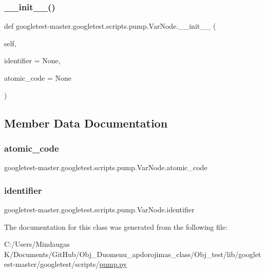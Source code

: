 \subsubsection{\texorpdfstring{\_\_init\_\_()}{\_\_init\_\_()}}
{\footnotesize\ttfamily def googletest-\/master.\+googletest.\+scripts.\+pump.\+Var\+Node.\+\_\+\+\_\+init\+\_\+\+\_\+ (\begin{DoxyParamCaption}\item[{}]{self,  }\item[{}]{identifier = {\ttfamily None},  }\item[{}]{atomic\+\_\+code = {\ttfamily None} }\end{DoxyParamCaption})}



\subsection{Member Data Documentation}
\mbox{\label{classgoogletest-master_1_1googletest_1_1scripts_1_1pump_1_1_var_node_ae7464059246a712124b1b94f722ff38f}} 
\subsubsection{\texorpdfstring{atomic\_code}{atomic\_code}}
{\footnotesize\ttfamily googletest-\/master.\+googletest.\+scripts.\+pump.\+Var\+Node.\+atomic\+\_\+code}

\mbox{\label{classgoogletest-master_1_1googletest_1_1scripts_1_1pump_1_1_var_node_ac88b07d63640932c7bb5121d97f4cced}} 
\subsubsection{\texorpdfstring{identifier}{identifier}}
{\footnotesize\ttfamily googletest-\/master.\+googletest.\+scripts.\+pump.\+Var\+Node.\+identifier}



The documentation for this class was generated from the following file\+:\begin{DoxyCompactItemize}
\item 
C\+:/\+Users/\+Mindaugas K/\+Documents/\+Git\+Hub/\+Obj\+\_\+\+Duomenu\+\_\+apdorojimas\+\_\+class/\+Obj\+\_\+test/lib/googletest-\/master/googletest/scripts/\mbox{\hyperlink{_obj__test_2lib_2googletest-master_2googletest_2scripts_2pump_8py}{pump.\+py}}\end{DoxyCompactItemize}
